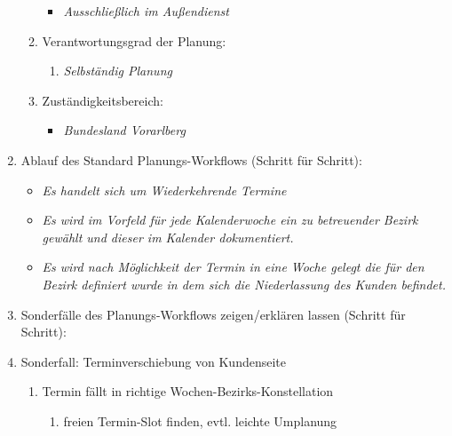 \documentclass[Bachelorarbeit.tex]{subfiles}
\begin{document}
\begin{enumerate}
\begin{enumerate}
\begin{itemize}
			\item[] \textit{Ausschließlich im Außendienst}
		\end{itemize}
		\item Verantwortungsgrad der Planung:
		\begin{enumerate}
			\item[] \textit{Selbständig Planung}
		\end{enumerate}
		\item Zuständigkeitsbereich:
		\begin{itemize}
			\item[] \textit{Bundesland Vorarlberg}
		\end{itemize}
	\end{enumerate}
	\item Ablauf des Standard Planungs-Workflows (Schritt für Schritt):

	\begin{itemize}
		
		\item \textit{Es handelt sich um Wiederkehrende Termine}
		\item \textit{Es wird im Vorfeld für jede Kalenderwoche ein zu betreuender Bezirk gewählt und dieser im Kalender dokumentiert.}
		\item \textit{Es wird nach Möglichkeit der Termin in eine Woche gelegt die für den Bezirk definiert wurde in dem sich die Niederlassung des Kunden befindet.}
	
	\end{itemize}
	\item Sonderfälle des Planungs-Workflows zeigen/erklären lassen (Schritt für Schritt):
	\item[] Sonderfall: Terminverschiebung von Kundenseite
	\label{interview1:sonderfall}
	\begin{enumerate}
		\item Termin fällt in richtige Wochen-Bezirks-Konstellation
		\label{interview1:sonderfall_optimal}
		\begin{enumerate}
			\item freien Termin-Slot finden, evtl. leichte Umplanung
			

\end{enumerate}
\end{enumerate}
\end{enumerate}
\end{document}
